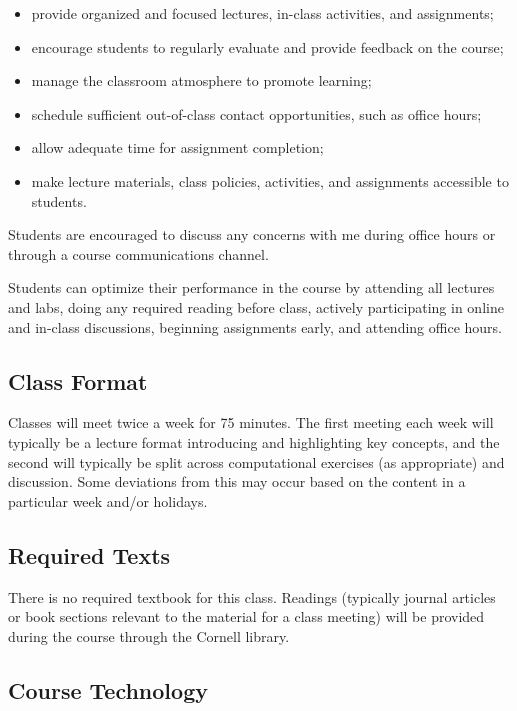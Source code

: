 \documentclass[12pt,a4paper]{article}
\begin{document}
\begin{itemize}
\item provide organized and focused lectures, in-class activities, and assignments;


\item encourage students to regularly evaluate and provide feedback on the course;


\item manage the classroom atmosphere to promote learning;


\item schedule sufficient out-of-class contact opportunities, such as office hours;


\item allow adequate time for assignment completion;


\item make lecture materials, class policies, activities, and assignments accessible to students. 

\end{itemize}
Students are encouraged to discuss any concerns with me during office hours or through a course communications channel.

Students can optimize their performance in the course by attending all lectures and labs, doing any required reading before class, actively participating in online and in-class discussions, beginning assignments early, and attending office hours. 

\subsection{Class Format}
Classes will meet twice a week for 75 minutes. The first meeting each week will typically be a lecture format introducing and highlighting key concepts, and the second will typically be split across computational exercises (as appropriate) and discussion. Some deviations from this may occur based on the content in a particular week and/or holidays.

\subsection{Required Texts}
There is no required textbook for this class. Readings (typically journal articles or book sections relevant to the material for a class meeting) will be provided during the course through the Cornell library.

\subsection{Course Technology}
\end{document}
